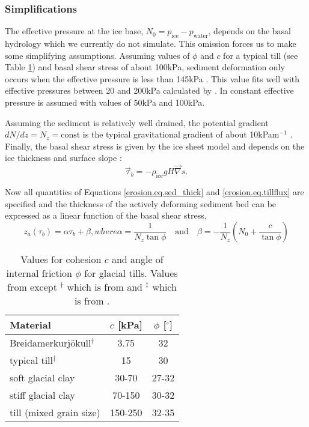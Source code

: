 \subsubsection{Simplifications}
The effective pressure at the ice base, $N_0=p_{\text{ice}}-p_{\text{water}}$, depends on the basal hydrology which we currently do not simulate. This omission forces us to make some simplifying assumptions. Assuming values of $\phi$ and $c$ for a typical till (see Table \ref{erosion.tab.typical_till}) and basal shear stress of about 100kPa, sediment deformation only occurs when the effective pressure is less than 145kPa \citep{Paterson1994}. This value fits well with effective pressures between 20 and 200kPa calculated by \citet{Boulton1996a}. In \citet{Boulton1996} constant effective pressure is assumed with values of 50kPa and 100kPa.

Assuming the sediment is relatively well drained, the potential gradient $dN/dz=N_z=\text{const}$ is the typical gravitational gradient of about 10kPam$^{-1}$ \citep{Boulton1996a}. Finally, the basal shear stress is given by the ice sheet model and depends on the ice thickness and surface slope \citep{Paterson1994}:
\begin{equation}
  \vec\tau_b=-\rho_{\text{ice}}gH\vec\nabla s.
\end{equation}

Now all quantities of Equations \eqref{erosion.eq.sed_thick} and \eqref{erosion.eq.tillflux} are specified and the thickness of the actively deforming sediment bed can be expressed as a linear function of the basal shear stress,
\begin{subequations}
  \begin{equation}
    \label{erosion.eq.sed_thick_param}
    z_a(\tau_b)=\alpha\tau_b+\beta,
  \end{equation}
  where
  \begin{equation}
    \alpha=\frac1{N_z\tan\phi}\quad\text{and}\quad\beta=-\frac1{N_z}\left({N_0}+\frac{c}{\tan\phi}\right)
  \end{equation}
\end{subequations}

\begin{table}[htbp]
  \centering
  \begin{tabular}{|l|cc|}
    \hline
    Material & $c$ [kPa] & $\phi$ [$^\circ$]\\
    \hline
    Breidamerkurj\"okull$^\dag$ & 3.75 & 32\\
    typical till$^\ddag$ & 15 & 30\\
    soft glacial clay & 30-70 & 27-32\\
    stiff glacial clay & 70-150 & 30-32\\
    till (mixed grain size) & 150-250 & 32-35\\
    \hline
  \end{tabular}
  \caption{Values for cohesion $c$ and angle of internal friction $\phi$ for glacial tills. Values from \citet{Benn1998} except $^\dag$ which is from \citet{Boulton1987} and $^\ddag$ which is from \citet{Clarke1987}.}
  \label{erosion.tab.typical_till}
\end{table}

